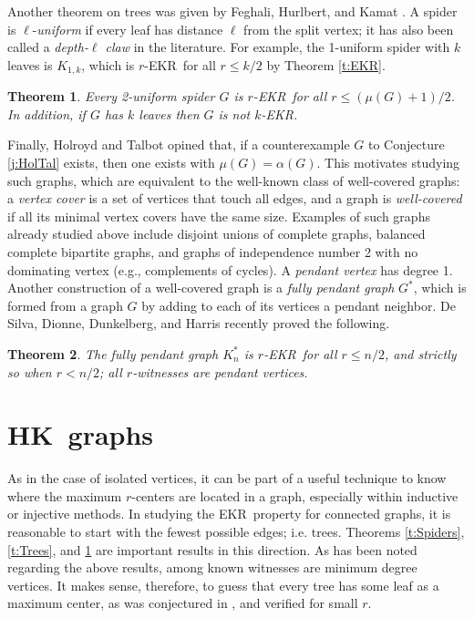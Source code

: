 \documentclass{article}
\newtheorem{thm}{Theorem}%
\def\a{{\alpha}}
\def\m{{\mu}}
\def\ekr{{\sf EKR}}
\def\hk{{\sf HK}}
\begin{document}
Another theorem on trees was given by Feghali, Hurlbert, and Kamat \cite{FegJohTho}.
A spider is $\ell$-{\it uniform} if every leaf has distance $\ell$ from the split vertex; it has also been called a {\it depth-$\ell$ claw} in the literature.
For example, the 1-uniform spider with $k$ leaves is $K_{1,k}$, which is $r$-\ekr\ for all $r\le k/2$ by Theorem \ref{t:EKR}.

\begin{thm}
\label{t:Claw2}
Every 2-uniform spider $G$ is $r$-\ekr\ for all $r\le (\m(G)+1)/2$.
In addition, if $G$ has $k$ leaves then $G$ is not $k$-\ekr.
\end{thm}

Finally, Holroyd and Talbot \cite{HolrTalb} opined that, if a counterexample $G$ to Conjecture \ref{j:HolTal} exists, then one exists with $\m(G)=\a(G)$.
This motivates studying such graphs, which are equivalent to the well-known class of well-covered graphs: 
a {\it vertex cover} is a set of vertices that touch all edges, and a graph is {\it well-covered} if all its minimal vertex covers have the same size.  
Examples of such graphs already studied above include disjoint unions of complete graphs, balanced complete bipartite graphs, and graphs of independence number 2 with no dominating vertex (e.g., complements of cycles).
A {\it pendant vertex} has degree 1.
Another construction of a well-covered graph is a {\it fully pendant graph} $G^*$, which is formed from a graph $G$ by adding to each of its vertices a pendant neighbor.
De Silva, Dionne, Dunkelberg, and Harris \cite{DeDiDuHa} recently proved the following.

\begin{thm}
\label{t:WellCovK}
The fully pendant graph $K_n^*$ is $r$-\ekr\ for all $r\le n/2$, and strictly so when $r<n/2$; all $r$-witnesses are pendant vertices.
\end{thm}



\section{\hk\ graphs}
\label{s:HK}

As in the case of isolated vertices, it can be part of a useful technique to know where the maximum $r$-centers are located in a graph, especially within inductive or injective methods.
In studying the \ekr\ property for connected graphs, it is reasonable to start with the fewest possible edges; i.e. trees.
Theorems \ref{t:Spiders}, \ref{t:Trees}, and \ref{t:Claw2} are important results in this direction.
As has been noted regarding the above results, among known witnesses are minimum degree vertices.
It makes sense, therefore, to guess that every tree has some leaf as a maximum center, as was conjectured in \cite{HurlKamaChord}, and verified for small $r$.
\end{document}
